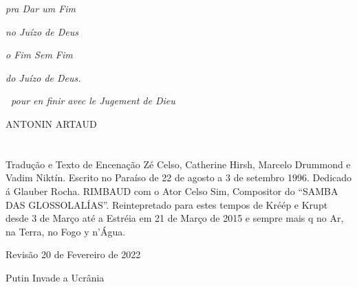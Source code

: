 \emph{pra Dar um Fim}

\emph{no Juízo de Deus}

\emph{o Fim Sem Fim}

\emph{do Juízo de Deus.}

\textbf{~}\emph{pour en finir avec le Jugement de Dieu}

ANTONIN ARTAUD

\chapter*{}
\mbox{}\vfill
\begin{flushleft}
Tradução e Texto de Encenação Zé Celso, Catherine Hirsh, Marcelo
Drummond e Vadim Niktín. Escrito no Paraíso de 22 de agosto a 3 de
setembro 1996. Dedicado á Glauber Rocha. RIMBAUD com o Ator Celso Sim,
Compositor do ``SAMBA DAS GLOSSOLALÍAS''. Reintepretado para estes tempos
de Kréép e Krupt desde 3 de Março até a Estréia em 21 de Março de 2015 e
sempre mais q no Ar, na Terra, no Fogo y n'Água.

Revisão 20 de Fevereiro de 2022

Putin Invade a Ucrânia
\end{flushleft}

